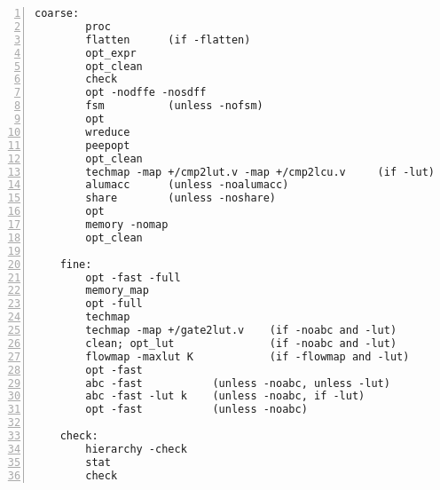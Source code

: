 \begin{lstlisting}[numbers=left,frame=single]
    coarse:
        proc
        flatten      (if -flatten)
        opt_expr
        opt_clean
        check
        opt -nodffe -nosdff
        fsm          (unless -nofsm)
        opt
        wreduce
        peepopt
        opt_clean
        techmap -map +/cmp2lut.v -map +/cmp2lcu.v     (if -lut)
        alumacc      (unless -noalumacc)
        share        (unless -noshare)
        opt
        memory -nomap
        opt_clean

    fine:
        opt -fast -full
        memory_map
        opt -full
        techmap
        techmap -map +/gate2lut.v    (if -noabc and -lut)
        clean; opt_lut               (if -noabc and -lut)
        flowmap -maxlut K            (if -flowmap and -lut)
        opt -fast
        abc -fast           (unless -noabc, unless -lut)
        abc -fast -lut k    (unless -noabc, if -lut)
        opt -fast           (unless -noabc)

    check:
        hierarchy -check
        stat
        check
\end{lstlisting}

